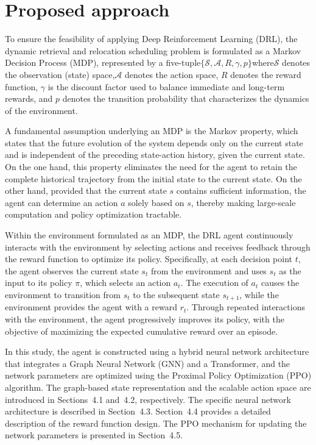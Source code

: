 \chapter{Proposed approach}\label{chap:Proposed approach}

To ensure the feasibility of applying Deep Reinforcement Learning (DRL), the dynamic retrieval and relocation scheduling problem is formulated as a Markov Decision Process (MDP), represented by a five-tuple$\{\mathcal{S}, \mathcal{A}, R, \gamma, p\}$where$\mathcal{S}$ denotes the observation (state) space,$\mathcal{A}$ denotes the action space, $R$ denotes the reward function, $\gamma$ is the discount factor used to balance immediate and long-term rewards, and $p$ denotes the transition probability that characterizes the dynamics of the environment.

A fundamental assumption underlying an MDP is the Markov property, which states that the future evolution of the system depends only on the current state and is independent of the preceding state-action history, given the current state. On the one hand, this property eliminates the need for the agent to retain the complete historical trajectory from the initial state to the current state. On the other hand, provided that the current state $s$ contains sufficient information, the agent can determine an action $a$ solely based on $s$, thereby making large-scale computation and policy optimization tractable.

Within the environment formulated as an MDP, the DRL agent continuously interacts with the environment by selecting actions and receives feedback through the reward function to optimize its policy. Specifically, at each decision point $t$, the agent observes the current state $s_t$ from the environment and uses $s_t$ as the input to its policy $\pi$, which selects an action $a_t$. The execution of $a_t$ causes the environment to transition from $s_t$ to the subsequent state $s_{t+1}$, while the environment provides the agent with a reward $r_t$. Through repeated interactions with the environment, the agent progressively improves its policy, with the objective of maximizing the expected cumulative reward over an episode.

In this study, the agent is constructed using a hybrid neural network architecture that integrates a Graph Neural Network (GNN) and a Transformer, and the network parameters are optimized using the Proximal Policy Optimization (PPO) algorithm. The graph-based state representation and the scalable action space are introduced in Sections~4.1 and~4.2, respectively. The specific neural network architecture is described in Section~4.3. Section~4.4 provides a detailed description of the reward function design. The PPO mechanism for updating the network parameters is presented in Section~4.5.

